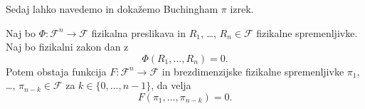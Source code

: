 \documentclass[mat2, tisk]{fmfdelo}
\begin{document}
Sedaj lahko navedemo in dokažemo Buchingham $\pi$ izrek.

 \begin{izrek}[Buchingham $\pi$]
 Naj bo $\Phi: \mathcal{F}^n \rightarrow \mathcal{F}$ fizikalna preslikava in 
 $R_1$, \dots, $R_n \in \mathcal{F}$ fizikalne spremenljivke. Naj bo fizikalni zakon dan z 
 \begin{equation}
 \Phi(R_1, \dots, R_n) = 0.
 \end{equation}
 Potem obstaja funkcija 
 $F: \mathcal{F}^n \rightarrow \mathcal{F}$ in brezdimenzijske fizikalne spremenljivke 
 $\pi_1$, \dots, $\pi_{n-k} \in \mathcal{F}$ za $k \in \{0, \dots, n-1\}$, da velja
 \begin{equation}
   F(\pi_1, \dots, \pi_{n-k}) = 0.
 \end{equation}
 \end{izrek}
\end{document}
